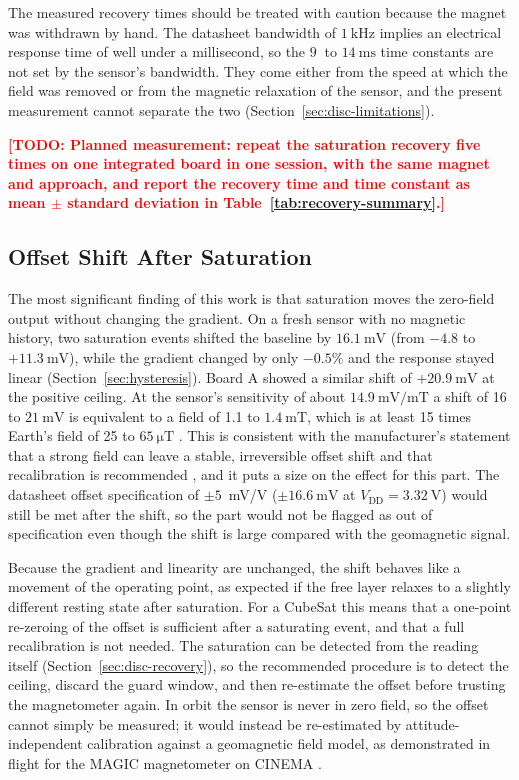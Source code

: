 \documentclass[12pt,a4paper]{article}
\newcommand{\todo}[1]{\textcolor{red}{\textbf{[TODO: #1]}}}
\begin{document}
The measured recovery times should be treated with caution because the magnet was withdrawn by hand. The datasheet bandwidth of $\SI{1}{\kilo\hertz}$ \cite{digikey_ct100} implies an electrical response time of well under a millisecond, so the $\SI{9}{}$ to $\SI{14}{\milli\second}$ time constants are not set by the sensor's bandwidth. They come either from the speed at which the field was removed or from the magnetic relaxation of the sensor, and the present measurement cannot separate the two (Section~\ref{sec:disc-limitations}).

\todo{Planned measurement: repeat the saturation recovery five times on one integrated board in one session, with the same magnet and approach, and report the recovery time and time constant as mean $\pm$ standard deviation in Table~\ref{tab:recovery-summary}.}

\subsection{Offset Shift After Saturation}
\label{sec:disc-hysteresis}

The most significant finding of this work is that saturation moves the zero-field output without changing the gradient. On a fresh sensor with no magnetic history, two saturation events shifted the baseline by $\SI{16.1}{\milli\volt}$ (from $-4.8$ to $+\SI{11.3}{\milli\volt}$), while the gradient changed by only $-0.5\%$ and the response stayed linear (Section~\ref{sec:hysteresis}). Board A showed a similar shift of $+\SI{20.9}{\milli\volt}$ at the positive ceiling. At the sensor's sensitivity of about $\SI{14.9}{\milli\volt\per\milli\tesla}$ a shift of 16 to $\SI{21}{\milli\volt}$ is equivalent to a field of 1.1 to $\SI{1.4}{\milli\tesla}$, which is at least 15 times Earth's field of 25 to $\SI{65}{\micro\tesla}$ \cite{wmm}. This is consistent with the manufacturer's statement that a strong field can leave a stable, irreversible offset shift and that recalibration is recommended \cite{allegro_an133}, and it puts a size on the effect for this part. The datasheet offset specification of $\pm 5$~mV/V ($\pm\SI{16.6}{\milli\volt}$ at $V_{\text{DD}} = \SI{3.32}{\volt}$) \cite{ct100_datasheet} would still be met after the shift, so the part would not be flagged as out of specification even though the shift is large compared with the geomagnetic signal.

Because the gradient and linearity are unchanged, the shift behaves like a movement of the operating point, as expected if the free layer relaxes to a slightly different resting state after saturation. For a CubeSat this means that a one-point re-zeroing of the offset is sufficient after a saturating event, and that a full recalibration is not needed. The saturation can be detected from the reading itself (Section~\ref{sec:disc-recovery}), so the recommended procedure is to detect the ceiling, discard the guard window, and then re-estimate the offset before trusting the magnetometer again. In orbit the sensor is never in zero field, so the offset cannot simply be measured; it would instead be re-estimated by attitude-independent calibration against a geomagnetic field model, as demonstrated in flight for the MAGIC magnetometer on CINEMA \cite{archer2015}.
\end{document}
